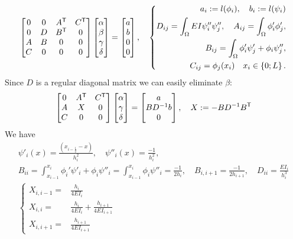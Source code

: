 \begin{equation}\label{eq:}
\begin{bmatrix}
0 & 0 & \transpose{A}& \transpose{C}\\
0 & D & \transpose{B}& 0\\
A & B & 0 & 0\\
C & 0 & 0 & 0
\end{bmatrix}
\begin{bmatrix}
\alpha \\ \beta \\ \gamma\\ \delta
\end{bmatrix}
=
\begin{bmatrix}
a \\ b \\ 0\\ 0
\end{bmatrix},\quad
%
\left\{
\begin{aligned}
a_i := l(\phi_i), \quad b_i:=l(\psi_i)\\
D_{ij} = \int_{\Omega} EI\psi_i''\psi''_j,\quad
A_{ij} = \int_{\Omega} \phi_i'\phi'_j,\\
B_{ij} = \int_{\Omega} \phi_i'\psi'_j+\phi_i\psi''_j,\\
C_{ij} = \phi_j(x_i) \quad x_i\in\Set{0;L}.
\end{aligned}
\right.
%
\end{equation}
%
Since $D$ is a regular diagonal matrix we can easily eliminate $\beta$:
%
\begin{align*}
\begin{bmatrix}
0 & {A}^{\mathsf{T}}& {C}^{\mathsf{T}}\\
A & X& 0\\
C & 0  & 0
\end{bmatrix}
\begin{bmatrix}
\alpha \\  \gamma\\ \delta
\end{bmatrix}
=
\begin{bmatrix}
a  \\ BD^{-1}b\\ 0
\end{bmatrix},\quad X:= -BD^{-1}{B}^{\mathsf{T}}
\end{align*}
%
We have
%
\begin{align*}
\psi'_i(x)=\frac{(x_{i-\frac12} -x)}{h_i^2},\quad
\psi''_i(x)=\frac{-1}{h_i^2},\\
B_{ii} = \int_{x_{i-1}}^{x_i} \phi_i'\psi'_i+\phi_i\psi''_i = \int_{x_{i-1}}^{x_i} \phi_i\psi''_i = \frac{-1}{2h_i},\quad
B_{i,i+1} = \frac{-1}{2h_{i+1}}, \quad D_{ii} = \frac{EI_i}{h_i^3}\\
%
\left\{
\begin{aligned}
X_{i,i-1} =& \frac{h_i}{4EI_i}\\
X_{i,i} =& \frac{h_i}{4EI_i}+\frac{h_{i+1}}{4EI_{i+1}}\\
X_{i,i+1} =& \frac{h_{i+1}}{4EI_{i+1}}
\end{aligned}
\right.
%
\end{align*}
%

%
%
\printbibliography[title=References Section~\thesection]
